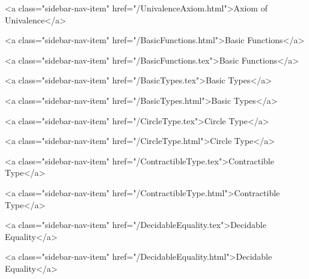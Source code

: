       
        
          <a class="sidebar-nav-item" href="/UnivalenceAxiom.html">Axiom of Univalence</a>
        
      
    
      
        
          <a class="sidebar-nav-item" href="/BasicFunctions.html">Basic Functions</a>
        
      
    
      
        
          <a class="sidebar-nav-item" href="/BasicFunctions.tex">Basic Functions</a>
        
      
    
      
        
          <a class="sidebar-nav-item" href="/BasicTypes.tex">Basic Types</a>
        
      
    
      
        
          <a class="sidebar-nav-item" href="/BasicTypes.html">Basic Types</a>
        
      
    
      
        
          <a class="sidebar-nav-item" href="/CircleType.tex">Circle Type</a>
        
      
    
      
        
          <a class="sidebar-nav-item" href="/CircleType.html">Circle Type</a>
        
      
    
      
        
          <a class="sidebar-nav-item" href="/ContractibleType.tex">Contractible Type</a>
        
      
    
      
        
          <a class="sidebar-nav-item" href="/ContractibleType.html">Contractible Type</a>
        
      
    
      
        
          <a class="sidebar-nav-item" href="/DecidableEquality.tex">Decidable Equality</a>
        
      
    
      
        
          <a class="sidebar-nav-item" href="/DecidableEquality.html">Decidable Equality</a>
        
